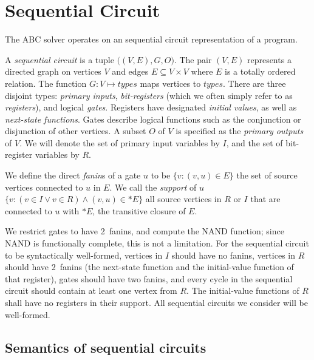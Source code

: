 \section{Sequential Circuit}
\label{sec:preliminaries}
The ABC solver operates on an sequential circuit representation of a program.
\begin{definition}
\rm A {\em sequential circuit} is a tuple $\big( (V, E),G,
O\big)$.  The pair $(V,E)$ represents a directed graph on
vertices $V$ and edges $E \subseteq V\times V$ where $E$
is a totally ordered relation.  The function $G: V \mapsto
{\mathit types}$ maps vertices to ${\mathit types}$.
There are three disjoint types: {\em primary inputs}, {\em
bit-registers} (which we often simply refer to as {\em
registers}), and logical {\em gates}.  Registers have designated
{\em initial values}, as well as {\em next-state
functions}.  Gates describe logical functions such as
the conjunction or disjunction of other vertices. 
A subset $O$ of $V$ is specified as the {\em
primary outputs} of $V$.  
We will denote the set of primary input variables by $I$,
and the set of bit-register variables by $R$.  
\label{def:back:seq_circuit}
\end{definition}

\begin{definition}[Fanins]
\rm We define the direct {\em fanin}s of a gate $u$ to be
$\{v: (v,u)\in E\}$ the set of source vertices connected
to $u$ in $E$.  We call the {\em support} of $u$ $\{v:
(v\in I \vee v \in R) \wedge (v,u) \in \ast E\}$ all
source vertices in $R$ or $I$ that are connected to $u$
with $\ast E$, the transitive closure of $E$.
\label{def:back:fanins} 
\end{definition}

We restrict gates to have 2~fanins, and
compute the NAND function; since NAND is functionally
complete, this is not a limitation.  For the sequential
circuit to be syntactically well-formed, vertices in $I$
should have no fanins, vertices in $R$ should have
2~fanins (the next-state function and the initial-value
function of that register), gates should have two fanins,
and every cycle in the sequential circuit should contain
at least one vertex from $R$.  The initial-value functions
of $R$ shall have no registers in their support.  All
sequential circuits we consider will be well-formed.  

\subsection{Semantics of sequential circuits}
\label{s:back:crct_semantics}

